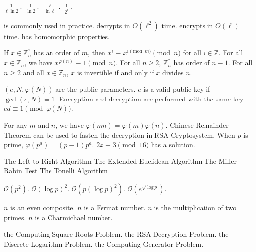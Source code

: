  
 {$\frac{1}{\ell \ln2}\cdot$}
 {$\frac{1}{\ln2}\cdot$}
 {$\frac{\ell}{ \ln{\ell}}\cdot$}
 {$\frac{1}{2^{\ell}}\cdot$}
 
{is commonly used in practice.}
{decrypts in $O(\ell^2)$ time.}
{encrypts in $O(\ell)$ time.}
{has homomorphic properties.}

 {If $x \in \mathbb{Z}_n^*$ has an order of $m$, then $x^i \equiv x^{i \pmod{m}} \pmod{n} $ for all $i\in \mathbb{Z}$. }
 {For all $x \in \mathbb{Z}_n$, we have $x^{\varphi(n)}\equiv 1 \pmod{n}$. }
 { For all $n \geq 2$, $\mathbb{Z}_n^*$ has order of $n-1$.}
 {For all $n \geq 2$ and all $x \in \mathbb{Z}_n$, $x$ is invertible if and only if $x$ divides $n$.}
 
 {$(e,N,\varphi(N))$ are the public parameters.}
 {$e$ is a valid public key if $\gcd(e,N)=1$.}
 {Encryption and decryption are performed with the same key.}
 {$ed \equiv 1 \pmod{\varphi(N)}$.}
 
 {For any $m$ and $n$,  we have $\varphi(mn)=\varphi(m)\varphi(n)$.}
 {Chinese Remainder Theorem can be used to fasten the decryption in RSA Cryptosystem.}
 {When $p$ is prime, $\varphi(p^a)=(p-1)p^a$.}
 {$2x\equiv 3 \pmod{16}$ has a solution.}
 
 {The Left to Right Algorithm}
{The Extended Euclidean Algorithm}
{The Miller-Rabin Test}
{The Tonelli Algorithm}

{$\mathcal{O}(p^2)$.}
{$\mathcal{O}(\log{p})^2$.}
{$\mathcal{O}(p(\log{p})^2)$.}
{$\mathcal{O}(e^{\sqrt {\log{p} }})$.}

{$n$ is an even composite.}
{$n$ is a Fermat number.}
{$n$ is the multiplication of two primes.}
{$n$ is a Charmichael number.}

{the Computing Square Roots Problem.}
{the RSA Decryption Problem.}
{the Discrete Logarithm Problem.}
{the Computing Generator Problem.}

